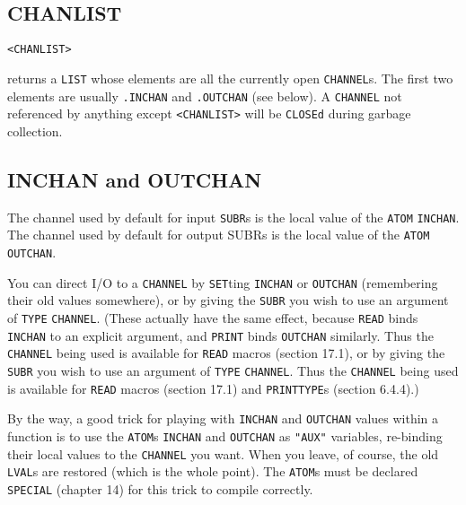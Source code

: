 \documentclass[a4paper]{scrbook}
\begin{document}
\subsection{CHANLIST}\label{chanlist}

\begin{verbatim}
<CHANLIST>
\end{verbatim}

 returns a \texttt{LIST} whose elements are all the currently open \texttt{CHANNEL}s. The
first two elements are usually \texttt{.INCHAN} and \texttt{.OUTCHAN} (see below). A \texttt{CHANNEL}
 not referenced by anything except \texttt{\textless{}CHANLIST\textgreater{}} will be
\texttt{CLOSEd} during garbage collection.

\subsection{INCHAN and OUTCHAN}\label{inchan-and-outchan}

The channel used by default for input \texttt{SUBR}s is the local value of the \texttt{ATOM}
\texttt{INCHAN}. The channel used by default for output SUBRs is the local value of the
\texttt{ATOM} \texttt{OUTCHAN}.

You can direct I/O to a \texttt{CHANNEL} by \texttt{SET}ting \texttt{INCHAN} or \texttt{OUTCHAN} (remembering their old
values somewhere), or by giving the \texttt{SUBR} you wish to use an argument of \texttt{TYPE} \texttt{CHANNEL}. (These
actually have the same effect, because \texttt{READ} binds \texttt{INCHAN} to an explicit argument, and \texttt{PRINT}
binds \texttt{OUTCHAN} similarly. Thus the \texttt{CHANNEL} being used is available for \texttt{READ} macros (section
17.1), or by giving the \texttt{SUBR} you wish to use an argument of \texttt{TYPE} \texttt{CHANNEL}. Thus the
\texttt{CHANNEL} being used is available for \texttt{READ} macros (section 17.1) and \texttt{PRINTTYPE}s (section 6.4.4).)

By the way, a good trick for playing with \texttt{INCHAN} and \texttt{OUTCHAN} values within a function is to use the
\texttt{ATOM}s \texttt{INCHAN} and \texttt{OUTCHAN} as \texttt{"AUX"}  variables, re-binding their
local values to the \texttt{CHANNEL} you want. When you leave, of course, the old \texttt{LVAL}s are restored (which is the
whole point). The \texttt{ATOM}s must be declared \texttt{SPECIAL} (chapter 14) for this trick to compile correctly.
\end{document}
